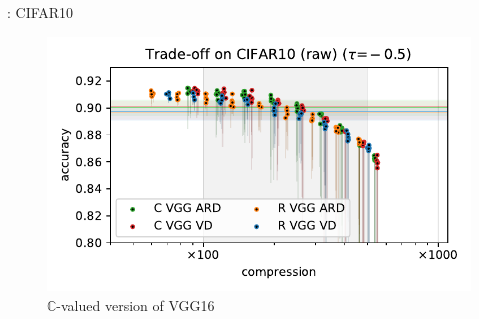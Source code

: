 \documentclass{beamer}
\newcommand{\cplx}{\mathbb{C}}
\begin{document}
\begin{frame}[c]{\insertsection: CIFAR10}
  \begin{figure}[t]
    \centering
    \includegraphics[width=\linewidth]{figure__cifar__trade-off/appendix__augmentedcifar10__raw__-0.5.pdf}
    \\
    {$\cplx$-valued version of VGG16 \citep{simonyan_very_2015}}
  \end{figure}

\end{frame}
\end{document}
